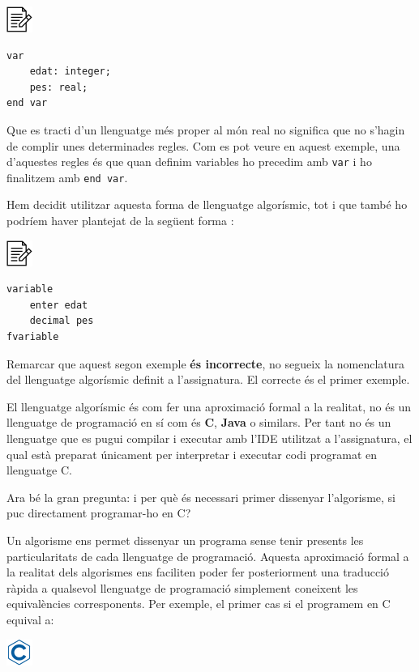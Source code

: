 \documentclass[]{book}
\begin{document}
\includegraphics{./img/alg.png}

\begin{verbatim}
var
    edat: integer;
    pes: real;
end var
\end{verbatim}

Que es tracti d'un llenguatge més proper al món real no significa que no
s'hagin de complir unes determinades regles. Com es pot veure en aquest
exemple, una d'aquestes regles és que quan definim variables ho precedim
amb \texttt{var} i ho finalitzem amb \texttt{end\ var}.

Hem decidit utilitzar aquesta forma de llenguatge algorísmic, tot i que
també ho podríem haver plantejat de la següent forma :

\includegraphics{./img/alg.png}

\begin{verbatim}
variable
    enter edat
    decimal pes
fvariable
\end{verbatim}

Remarcar que aquest segon exemple \textbf{és incorrecte}, no segueix la
nomenclatura del llenguatge algorísmic definit a l'assignatura. El
correcte és el primer exemple.

El llenguatge algorísmic és com fer una aproximació formal a la
realitat, no és un llenguatge de programació en sí com és \textbf{C},
\textbf{Java} o similars. Per tant no és un llenguatge que es pugui
compilar i executar amb l'IDE utilitzat a l'assignatura, el qual està
preparat únicament per interpretar i executar codi programat en
llenguatge C.

Ara bé la gran pregunta: i per què és necessari primer dissenyar
l'algorisme, si puc directament programar-ho en C?

Un algorisme ens permet dissenyar un programa sense tenir presents les
particularitats de cada llenguatge de programació. Aquesta aproximació
formal a la realitat dels algorismes ens faciliten poder fer
posteriorment una traducció ràpida a qualsevol llenguatge de programació
simplement coneixent les equivalències corresponents. Per exemple, el
primer cas si el programem en C equival a:

\includegraphics{./img/c.png}
\end{document}

